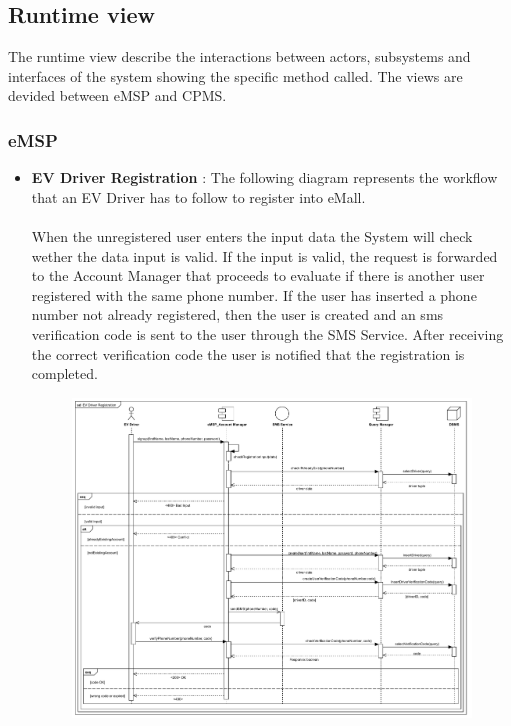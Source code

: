 \pagebreak
\subsection{Runtime view}
The runtime view describe the interactions between actors, subsystems and interfaces of the system showing the specific method called.
The views are devided between eMSP and CPMS.

\subsubsection{eMSP}
\begin{itemize}
    \item \textbf{EV Driver Registration} : The following diagram represents the workflow that an EV Driver has to follow to register into eMall.\\
          \\When the unregistered user enters the input data the System will check wether the data input is valid. If the input is valid,
          the request is forwarded to the Account Manager that proceeds to evaluate if there is another user registered with
          the same phone number. If the user has inserted a phone number not already registered, then the user is created and an sms verification
          code is sent to the user through the SMS Service. After receiving the correct verification code the user is notified that the
          registration is completed.
          \begin{figure}[H]
              \centering
              \includegraphics[scale=0.55]{src/runtimeView/eMSP_Registration.pdf}

\end{figure}
\end{itemize}

